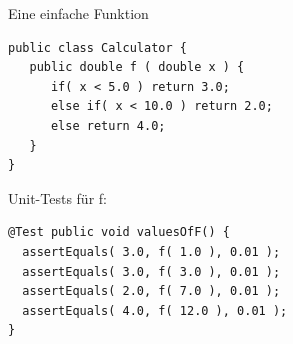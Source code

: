 \begin{frame}[t,fragile]{Eine einfache Funktion} %
\begin{lstlisting}
public class Calculator {   
   public double f ( double x ) {
      if( x < 5.0 ) return 3.0;
      else if( x < 10.0 ) return 2.0;
      else return 4.0;
   }
}
\end{lstlisting}

\begin{minipage}[t]{3.5cm}
\end{minipage} 
\hfill
\begin{minipage}[t]{7cm}
Unit-Tests für  f:

\begin{lstlisting}
@Test public void valuesOfF() {
  assertEquals( 3.0, f( 1.0 ), 0.01 );
  assertEquals( 3.0, f( 3.0 ), 0.01 );
  assertEquals( 2.0, f( 7.0 ), 0.01 );
  assertEquals( 4.0, f( 12.0 ), 0.01 );
}
\end{lstlisting}
\end{minipage}

\end{frame}

